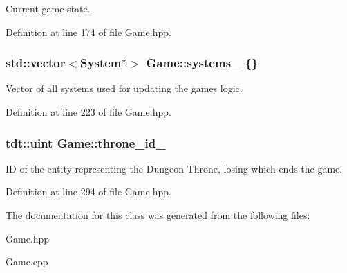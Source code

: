 Current game state. 



Definition at line 174 of file Game.\+hpp.

\subsubsection[{\texorpdfstring{systems\+\_\+}{systems_}}]{\setlength{\rightskip}{0pt plus 5cm}std\+::vector$<${\bf System}$\ast$$>$ Game\+::systems\+\_\+ \{\}\hspace{0.3cm}{\ttfamily [private]}}\hypertarget{class_game_af594421c81bec3f6284ccdb8d3888080}{}\label{class_game_af594421c81bec3f6284ccdb8d3888080}


Vector of all systems used for updating the game\textquotesingle{}s logic. 



Definition at line 223 of file Game.\+hpp.

\subsubsection[{\texorpdfstring{throne\+\_\+id\+\_\+}{throne_id_}}]{\setlength{\rightskip}{0pt plus 5cm}tdt\+::uint Game\+::throne\+\_\+id\+\_\+\hspace{0.3cm}{\ttfamily [private]}}\hypertarget{class_game_add2c7263d03befb832ce112ccf09b3eb}{}\label{class_game_add2c7263d03befb832ce112ccf09b3eb}


ID of the entity representing the Dungeon Throne, losing which ends the game. 



Definition at line 294 of file Game.\+hpp.



The documentation for this class was generated from the following files\+:\begin{DoxyCompactItemize}
\item 
Game.\+hpp\item 
Game.\+cpp\end{DoxyCompactItemize}
